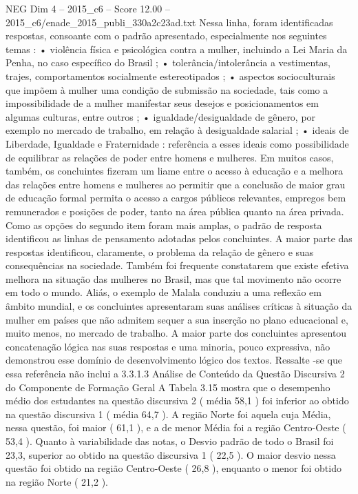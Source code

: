 \begin{textsample}{NEG Dim 4 – 2015\_c6 – Score 12.00 – 2015\_c6/enade\_2015\_publi\_330a2c23ad.txt}
Nessa linha, foram identificadas respostas, consoante com o padrão apresentado, especialmente nos seguintes temas : • violência física e psicológica contra a mulher, incluindo a Lei Maria da Penha, no caso específico do Brasil ; • tolerância/intolerância a vestimentas, trajes, comportamentos socialmente estereotipados ; • aspectos socioculturais que impõem à mulher uma condição de submissão na sociedade, tais como a impossibilidade de a mulher manifestar seus desejos e posicionamentos em algumas culturas, entre outros ; • igualdade/desigualdade de gênero, por exemplo no mercado de trabalho, em relação à desigualdade salarial ; • ideais de Liberdade, Igualdade e Fraternidade : referência a esses ideais como possibilidade de equilibrar as relações de poder entre homens e mulheres.
Em muitos casos, também, os concluintes fizeram um liame entre o acesso à educação e a melhora das relações entre homens e mulheres ao permitir que a conclusão de maior grau de educação formal permita o acesso a cargos públicos relevantes, empregos bem remunerados e posições de poder, tanto na área pública quanto na área privada.
Como as opções do segundo item foram mais amplas, o padrão de resposta identificou as linhas de pensamento adotadas pelos concluintes.
A maior parte das respostas identificou, claramente, o problema da relação de gênero e suas consequências na sociedade.
Também foi frequente constatarem que existe efetiva melhora na situação das mulheres no Brasil, mas que tal movimento não ocorre em todo o mundo.
Aliás, o exemplo de Malala conduziu a uma reflexão em âmbito mundial, e os concluintes apresentaram suas análises críticas à situação da mulher em países que não admitem sequer a sua inserção no plano educacional e, muito menos, no mercado de trabalho.
A maior parte dos concluintes apresentou concatenação lógica nas suas respostas e uma minoria, pouco expressiva, não demonstrou esse domínio de desenvolvimento lógico dos textos.
Ressalte -se que essa referência não inclui a 3.3.1.3 Análise de Conteúdo da Questão Discursiva 2 do Componente de Formação Geral A Tabela 3.15 mostra que o desempenho médio dos estudantes na questão discursiva 2 ( média 58,1 ) foi inferior ao obtido na questão discursiva 1 ( média 64,7 ).
A região Norte foi aquela cuja Média, nessa questão, foi maior ( 61,1 ), e a de menor Média foi a região Centro-Oeste ( 53,4 ).
Quanto à variabilidade das notas, o Desvio padrão de todo o Brasil foi 23,3, superior ao obtido na questão discursiva 1 ( 22,5 ).
O maior desvio nessa questão foi obtido na região Centro-Oeste ( 26,8 ), enquanto o menor foi obtido na região Norte ( 21,2 ).

\end{textsample}
